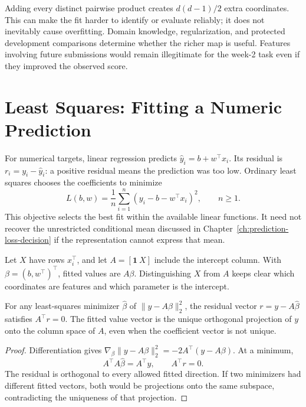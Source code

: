 Adding every distinct pairwise product creates $d(d-1)/2$ extra coordinates. This can make the fit harder to identify or evaluate reliably; it does not inevitably cause overfitting. Domain knowledge, regularization, and protected development comparisons determine whether the richer map is useful. Features involving future submissions would remain illegitimate for the week-2 task even if they improved the observed score.

\section{Least Squares: Fitting a Numeric Prediction}

For numerical targets, linear regression predicts $\hat y_i=b+w^\top x_i$. Its residual is $r_i=y_i-\hat y_i$: a positive residual means the prediction was too low. Ordinary least squares chooses the coefficients to minimize
\[
L(b,w)=\frac1n\sum_{i=1}^n(y_i-b-w^\top x_i)^2,
\qquad n\geq1.
\]
This objective selects the best fit within the available linear functions. It need not recover the unrestricted conditional mean discussed in Chapter~\ref{ch:prediction-loss-decision} if the representation cannot express that mean.

Let $X$ have rows $x_i^\top$, and let $A=[\mathbf1\ X]$ include the intercept column. With $\beta=(b,w^\top)^\top$, fitted values are $A\beta$. Distinguishing $X$ from $A$ keeps clear which coordinates are features and which parameter is the intercept.

\par\medskip\noindent\begin{minipage}{\linewidth}
\begin{theorem}
For any least-squares minimizer $\hat\beta$ of $\|y-A\beta\|_2^2$, the residual vector $r=y-A\hat\beta$ satisfies $A^\top r=0$. The fitted value vector is the unique orthogonal projection of $y$ onto the column space of $A$, even when the coefficient vector is not unique.
\end{theorem}
\begin{proof}
Differentiation gives $\nabla_\beta\|y-A\beta\|_2^2=-2A^\top(y-A\beta)$. At a minimum,
\[
A^\top A\hat\beta=A^\top y,
\qquad A^\top r=0.
\]
The residual is orthogonal to every allowed fitted direction. If two minimizers had different fitted vectors, both would be projections onto the same subspace, contradicting the uniqueness of that projection.
\end{proof}
\end{minipage}\par\medskip

